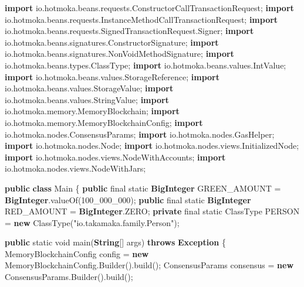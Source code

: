 \documentclass[a4paper,]{book}
\newenvironment{Shaded}{\begin{snugshade}}{\end{snugshade}}
\newcommand{\BuiltInTok}[1]{\textcolor[rgb]{0.39,0.29,0.61}{\textbf{#1}}}
\newcommand{\DataTypeTok}[1]{\textcolor[rgb]{0.00,0.34,0.68}{#1}}
\newcommand{\DecValTok}[1]{\textcolor[rgb]{0.69,0.50,0.00}{#1}}
\newcommand{\FunctionTok}[1]{\textcolor[rgb]{0.39,0.29,0.61}{#1}}
\newcommand{\ImportTok}[1]{\textcolor[rgb]{1.00,0.33,0.00}{#1}}
\newcommand{\KeywordTok}[1]{\textcolor[rgb]{0.12,0.11,0.11}{\textbf{#1}}}
\newcommand{\NormalTok}[1]{\textcolor[rgb]{0.12,0.11,0.11}{#1}}
\newcommand{\StringTok}[1]{\textcolor[rgb]{0.75,0.01,0.01}{#1}}
\renewenvironment{Shaded}{\begin{snugshade}\small}{\end{snugshade}}
\begin{document}
{\begin{Shaded}
\begin{Highlighting}[]
\KeywordTok{import}\ImportTok{ io.hotmoka.beans.requests.ConstructorCallTransactionRequest;}
\KeywordTok{import}\ImportTok{ io.hotmoka.beans.requests.InstanceMethodCallTransactionRequest;}
\KeywordTok{import}\ImportTok{ io.hotmoka.beans.requests.SignedTransactionRequest.Signer;}
\KeywordTok{import}\ImportTok{ io.hotmoka.beans.signatures.ConstructorSignature;}
\KeywordTok{import}\ImportTok{ io.hotmoka.beans.signatures.NonVoidMethodSignature;}
\KeywordTok{import}\ImportTok{ io.hotmoka.beans.types.ClassType;}
\KeywordTok{import}\ImportTok{ io.hotmoka.beans.values.IntValue;}
\KeywordTok{import}\ImportTok{ io.hotmoka.beans.values.StorageReference;}
\KeywordTok{import}\ImportTok{ io.hotmoka.beans.values.StorageValue;}
\KeywordTok{import}\ImportTok{ io.hotmoka.beans.values.StringValue;}
\KeywordTok{import}\ImportTok{ io.hotmoka.memory.MemoryBlockchain;}
\KeywordTok{import}\ImportTok{ io.hotmoka.memory.MemoryBlockchainConfig;}
\KeywordTok{import}\ImportTok{ io.hotmoka.nodes.ConsensusParams;}
\KeywordTok{import}\ImportTok{ io.hotmoka.nodes.GasHelper;}
\KeywordTok{import}\ImportTok{ io.hotmoka.nodes.Node;}
\KeywordTok{import}\ImportTok{ io.hotmoka.nodes.views.InitializedNode;}
\KeywordTok{import}\ImportTok{ io.hotmoka.nodes.views.NodeWithAccounts;}
\KeywordTok{import}\ImportTok{ io.hotmoka.nodes.views.NodeWithJars;}


\KeywordTok{public} \KeywordTok{class}\NormalTok{ Main \{}
  \KeywordTok{public} \DataTypeTok{final} \DataTypeTok{static} \BuiltInTok{BigInteger}\NormalTok{ GREEN_AMOUNT = }\BuiltInTok{BigInteger}\NormalTok{.}\FunctionTok{valueOf}\NormalTok{(}\DecValTok{100_000_000}\NormalTok{);}
  \KeywordTok{public} \DataTypeTok{final} \DataTypeTok{static} \BuiltInTok{BigInteger}\NormalTok{ RED_AMOUNT = }\BuiltInTok{BigInteger}\NormalTok{.}\FunctionTok{ZERO}\NormalTok{;}
  \KeywordTok{private} \DataTypeTok{final} \DataTypeTok{static}\NormalTok{ ClassType PERSON = }\KeywordTok{new} \FunctionTok{ClassType}\NormalTok{(}\StringTok{"io.takamaka.family.Person"}\NormalTok{);}

  \KeywordTok{public} \DataTypeTok{static} \DataTypeTok{void} \FunctionTok{main}\NormalTok{(}\BuiltInTok{String}\NormalTok{[] args) }\KeywordTok{throws} \BuiltInTok{Exception}\NormalTok{ \{}
\NormalTok{    MemoryBlockchainConfig config = }\KeywordTok{new}\NormalTok{ MemoryBlockchainConfig.}\FunctionTok{Builder}\NormalTok{().}\FunctionTok{build}\NormalTok{();}
\NormalTok{    ConsensusParams consensus = }\KeywordTok{new}\NormalTok{ ConsensusParams.}\FunctionTok{Builder}\NormalTok{().}\FunctionTok{build}\NormalTok{();}


\end{Highlighting}
\end{Shaded}}
\end{document}
